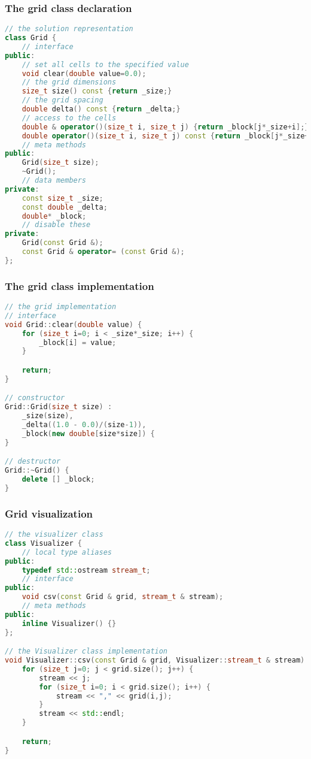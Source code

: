 \begin{frame}[fragile]
%
  \frametitle{The grid class declaration}
%
  \begin{lstlisting}[language=c++,name=seq:grid,firstnumber=29]
// the solution representation
class Grid {
    // interface
public:
    // set all cells to the specified value
    void clear(double value=0.0);
    // the grid dimensions
    size_t size() const {return _size;}
    // the grid spacing
    double delta() const {return _delta;}
    // access to the cells
    double & operator()(size_t i, size_t j) {return _block[j*_size+i];}
    double operator()(size_t i, size_t j) const {return _block[j*_size+i];}
    // meta methods
public:
    Grid(size_t size);
    ~Grid();
    // data members
private:
    const size_t _size;
    const double _delta;
    double* _block;
    // disable these
private:
    Grid(const Grid &);
    const Grid & operator= (const Grid &);
};

  \end{lstlisting}
%
\end{frame}

\begin{frame}[fragile]
%
  \frametitle{The grid class implementation}
%
  \begin{lstlisting}[language=c++,name=seq:grid]
// the grid implementation
// interface
void Grid::clear(double value) {
    for (size_t i=0; i < _size*_size; i++) {
        _block[i] = value;
    }

    return;
}

// constructor
Grid::Grid(size_t size) :
    _size(size), 
    _delta((1.0 - 0.0)/(size-1)),
    _block(new double[size*size]) {
}

// destructor
Grid::~Grid() {
    delete [] _block;
}

  \end{lstlisting}
%
\end{frame}

\begin{frame}[fragile]
%
  \frametitle{Grid visualization}
%
  \begin{lstlisting}[language=c++,name=seq:visualizer,firstnumer=97]
// the visualizer class
class Visualizer {
    // local type aliases
public:
    typedef std::ostream stream_t;
    // interface
public:
    void csv(const Grid & grid, stream_t & stream);
    // meta methods
public:
    inline Visualizer() {}
};

// the Visualizer class implementation
void Visualizer::csv(const Grid & grid, Visualizer::stream_t & stream) {
    for (size_t j=0; j < grid.size(); j++) {
        stream << j;
        for (size_t i=0; i < grid.size(); i++) {
            stream << "," << grid(i,j);
        }
        stream << std::endl;
    }

    return;
}

  \end{lstlisting}
%
\end{frame}

